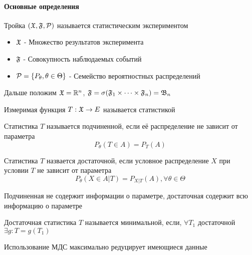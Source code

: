 \documentclass[main.tex]{subfiles}
\begin{document}
\paragraph{Основные определения}
\begin{definition}
	Тройка $(\mathfrak{X},\mathfrak{F},\mathcal{P})$ называется статистическим экспериментом
	\begin{itemize}
		\item $\mathfrak{X}$ - Множество результатов эксперимента
		\item $\mathfrak{F}$ - Совокупность наблюдаемых событий
		\item $\mathcal{P}=\{P_\theta, \theta \in \Theta\}$ - Семейство вероятностных распределений
	\end{itemize}
\end{definition}
Дальше положим $\mathfrak{X}=\mathbb{R}^n$, $\mathfrak{F}=\sigma(\mathfrak{F}_1 \times \dots \times \mathfrak{F}_n)=\mathfrak{B}_n$

\begin{definition}[Статистика]
	Измеримая функция $T:\mathfrak{X} \rightarrow E$ называется статистикой
\end{definition}

\begin{definition}
	Статистика $T$ называется подчиненной, если её распределение не зависит от параметра
	$$P_\theta (T\in A) = P_T(A)$$
\end{definition}

\begin{definition}
	Статистика $T$ назвается достаточной, если условное распределение $X$ при условии $T$ не зависит от параметра
	$$P_\theta(X\in A|T) = P_{X|T}(A),\forall \theta \in \Theta $$
\end{definition}

Подчиненная не содержит информации о параметре, достаточная содержит всю информацию о параметре

\begin{definition}
	Достаточная статистика $T$ называется минимальной, если, $\forall T_1$ достаточной ${\exists g : T=g(T_1)}$
\end{definition}
Использование МДС максимально редуцирует имеющиеся данные
\end{document}
